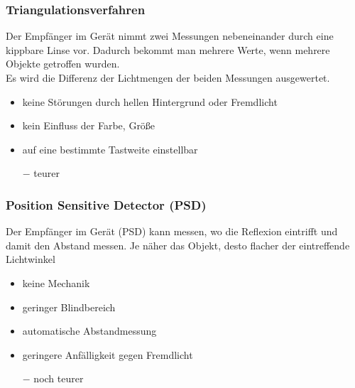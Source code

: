 \documentclass{scrreprt}
\begin{document}
\subsubsection*{Triangulationsverfahren}
Der Empfänger im Gerät nimmt zwei Messungen nebeneinander durch eine kippbare Linse vor. Dadurch bekommt man mehrere Werte, wenn mehrere Objekte getroffen wurden.\\
Es wird die Differenz der Lichtmengen der beiden Messungen ausgewertet.
\begin{itemize}[label=$+$]
\item keine Störungen durch hellen Hintergrund oder Fremdlicht
\item kein Einfluss der Farbe, Größe
\item auf eine bestimmte Tastweite einstellbar
\item[$-$] teurer
\end{itemize}

\subsubsection*{Position Sensitive Detector (PSD)}
Der Empfänger im Gerät (PSD) kann messen, wo die Reflexion eintrifft und damit den Abstand messen. Je näher das Objekt, desto flacher der eintreffende Lichtwinkel
\begin{itemize}[label=$+$]
\item keine Mechanik
\item geringer Blindbereich
\item automatische Abstandmessung
\item geringere Anfälligkeit gegen Fremdlicht
\item[$-$] noch teurer
\end{itemize}
\end{document}
